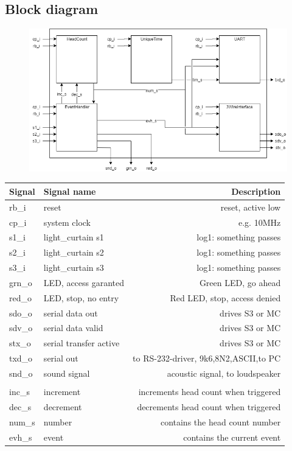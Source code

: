 \documentclass[12pt,a4 paper] {article}
\begin{document}
\subsection{Block diagram}
\begin{figure}[h]
	\centering	
	\includegraphics[scale=0.5]{../png/top.png}
\end{figure}
\newpage

\begin{center}
\begin{tabular}{llr}
Signal & Signal name & Description \\ \hline
rb\_i & reset & reset, active low \\
cp\_i & system clock & e.g. 10MHz \\
s1\_i & light\_curtain s1 & log1: something passes \\
s2\_i & light\_curtain s2 & log1: something passes \\
s3\_i & light\_curtain s3 & log1: something passes \\
grn\_o & LED, access garanted & Green LED, go ahead \\
red\_o & LED, stop, no entry & Red LED, stop, access denied \\
sdo\_o & serial data out & drives S3 or MC\\
sdv\_o & serial data valid & drives S3 or MC\\
stx\_o & serial transfer active & drives S3 or MC\\
txd\_o & serial out & to RS-232-driver, 9k6,8N2,ASCII,to PC\\
snd\_o & sound signal & acoustic signal, to loudspeaker\\
\\
inc\_s & increment & increments head count when triggered\\
dec\_s & decrement & decrements head count when triggered\\
num\_s &number & contains the head count number\\
evh\_s & event & contains the current event\\
\end{tabular}
\end{center}
\end{document}
